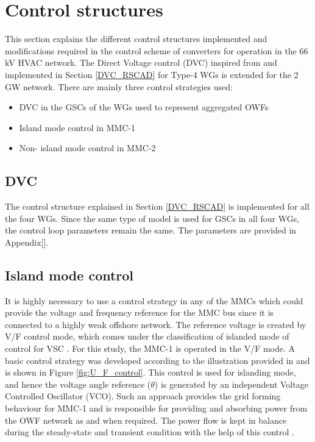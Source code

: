\section{Control structures}\label{control_structures}
This section explains the different control structures implemented and modifications required in the control scheme of converters for operation in the 66 kV \gls{HVAC} network. The Direct Voltage control (\gls{DVC}) inspired from \cite{erlich_new_2017} and implemented in Section \ref{DVC_RSCAD} for Type-4 \gls{WG}s is extended for the 2 GW network. There are mainly three control strategies used:
\begin{itemize}
    \item \gls{DVC} in the \gls{GSC}s of the \gls{WG}s used to represent aggregated \gls{OWF}s 
    \item Island mode control in \gls{MMC}-1
    \item Non- island mode control in \gls{MMC}-2
\end{itemize}

\subsection{DVC}
The control structure explained in Section \ref{DVC_RSCAD} is implemented for all the four \gls{WG}s. Since the same type of model is used for \gls{GSC}s in all four \gls{WG}s, the control loop parameters remain the same. The parameters are provided in Appendix[].

\subsection{Island mode control}
It is highly necessary to use a control strategy in any of the \gls{MMC}s which could provide the voltage and frequency reference for the \gls{MMC} bus since it is connected to a highly weak offshore network. The reference voltage is created by V/F control mode, which comes under the classification of islanded mode of control for \gls{VSC} \cite{vrana2013cigre}. For this study, the \gls{MMC}-1 is operated in the V/F mode. A basic control strategy was developed according to the illustration provided in \cite{wachal2014guide} and is shown in Figure \ref{fig:U_F_control}. This control is used for islanding mode, and hence the voltage angle reference ($\theta$) is generated by an independent Voltage Controlled Oscillator (VCO). Such an approach provides the grid forming behaviour for \gls{MMC}-1 and is responsible for providing and absorbing power from the \gls{OWF} network as and when required. The power flow is kept in balance during the steady-state and transient condition with the help of this control \cite{cigre_B455}.  

